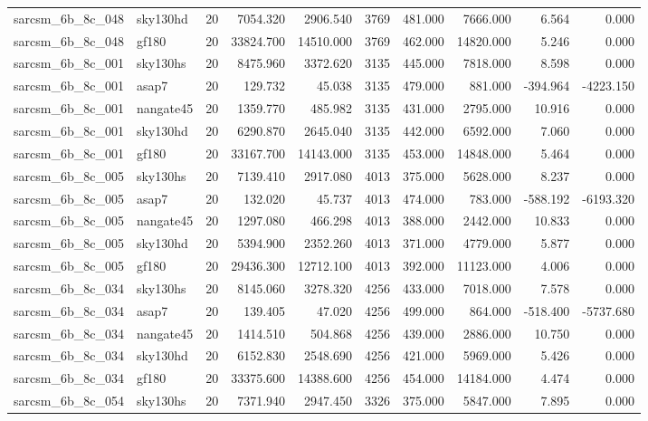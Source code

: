 \documentclass{article}
\begin{document}
\begin{longtable}{llrrrrrrrr}
sarcsm\_6b\_8c\_048 & sky130hd & 20 & 7054.320 & 2906.540 & 3769 & 481.000 & 7666.000 & 6.564 & 0.000 \\
sarcsm\_6b\_8c\_048 & gf180 & 20 & 33824.700 & 14510.000 & 3769 & 462.000 & 14820.000 & 5.246 & 0.000 \\
sarcsm\_6b\_8c\_001 & sky130hs & 20 & 8475.960 & 3372.620 & 3135 & 445.000 & 7818.000 & 8.598 & 0.000 \\
sarcsm\_6b\_8c\_001 & asap7 & 20 & 129.732 & 45.038 & 3135 & 479.000 & 881.000 & -394.964 & -4223.150 \\
sarcsm\_6b\_8c\_001 & nangate45 & 20 & 1359.770 & 485.982 & 3135 & 431.000 & 2795.000 & 10.916 & 0.000 \\
sarcsm\_6b\_8c\_001 & sky130hd & 20 & 6290.870 & 2645.040 & 3135 & 442.000 & 6592.000 & 7.060 & 0.000 \\
sarcsm\_6b\_8c\_001 & gf180 & 20 & 33167.700 & 14143.000 & 3135 & 453.000 & 14848.000 & 5.464 & 0.000 \\
sarcsm\_6b\_8c\_005 & sky130hs & 20 & 7139.410 & 2917.080 & 4013 & 375.000 & 5628.000 & 8.237 & 0.000 \\
sarcsm\_6b\_8c\_005 & asap7 & 20 & 132.020 & 45.737 & 4013 & 474.000 & 783.000 & -588.192 & -6193.320 \\
sarcsm\_6b\_8c\_005 & nangate45 & 20 & 1297.080 & 466.298 & 4013 & 388.000 & 2442.000 & 10.833 & 0.000 \\
sarcsm\_6b\_8c\_005 & sky130hd & 20 & 5394.900 & 2352.260 & 4013 & 371.000 & 4779.000 & 5.877 & 0.000 \\
sarcsm\_6b\_8c\_005 & gf180 & 20 & 29436.300 & 12712.100 & 4013 & 392.000 & 11123.000 & 4.006 & 0.000 \\
sarcsm\_6b\_8c\_034 & sky130hs & 20 & 8145.060 & 3278.320 & 4256 & 433.000 & 7018.000 & 7.578 & 0.000 \\
sarcsm\_6b\_8c\_034 & asap7 & 20 & 139.405 & 47.020 & 4256 & 499.000 & 864.000 & -518.400 & -5737.680 \\
sarcsm\_6b\_8c\_034 & nangate45 & 20 & 1414.510 & 504.868 & 4256 & 439.000 & 2886.000 & 10.750 & 0.000 \\
sarcsm\_6b\_8c\_034 & sky130hd & 20 & 6152.830 & 2548.690 & 4256 & 421.000 & 5969.000 & 5.426 & 0.000 \\
sarcsm\_6b\_8c\_034 & gf180 & 20 & 33375.600 & 14388.600 & 4256 & 454.000 & 14184.000 & 4.474 & 0.000 \\
sarcsm\_6b\_8c\_054 & sky130hs & 20 & 7371.940 & 2947.450 & 3326 & 375.000 & 5847.000 & 7.895 & 0.000 \\

\end{longtable}
\end{document}
